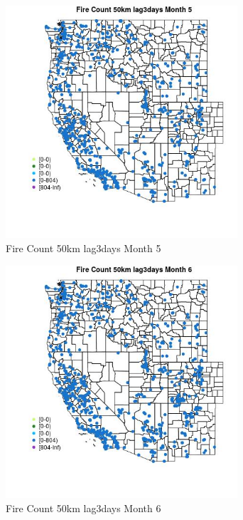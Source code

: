\begin{figure} 
\centering  
\includegraphics[width=0.77\textwidth]{Code_Outputs/Report_ML_input_PM25_Step4_part_f_de_duplicated_aveswNAs_MapObsMo5Fire_Count_50km_lag3days.jpg} 
\caption{\label{fig:Report_ML_input_PM25_Step4_part_f_de_duplicated_aveswNAsMapObsMo5Fire_Count_50km_lag3days}Fire Count 50km lag3days Month 5} 
\end{figure} 
 

\begin{figure} 
\centering  
\includegraphics[width=0.77\textwidth]{Code_Outputs/Report_ML_input_PM25_Step4_part_f_de_duplicated_aveswNAs_MapObsMo6Fire_Count_50km_lag3days.jpg} 
\caption{\label{fig:Report_ML_input_PM25_Step4_part_f_de_duplicated_aveswNAsMapObsMo6Fire_Count_50km_lag3days}Fire Count 50km lag3days Month 6} 
\end{figure} 
 

